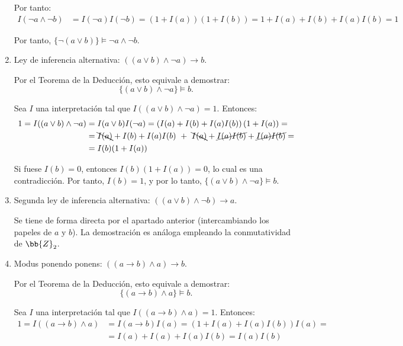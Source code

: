 \begin{ejercicio}
\begin{enumerate}
        Por tanto:
        \begin{align*}
            I(\neg a \land \neg b) &= I(\neg a)I(\neg b) = (1+I(a))(1+I(b)) = 1+I(a)+I(b)+I(a)I(b) = 1
        \end{align*}

        Por tanto, $\{\neg(a\lor b)\} \vDash \neg a \land \neg b$.
        \item Ley de inferencia alternativa: $((a\lor b)\land \neg a) \rightarrow b$.
        
        Por el Teorema de la Deducción, esto equivale a demostrar:
        \begin{equation*}
            \{(a\lor b)\land \neg a\} \vDash b.
        \end{equation*}

        Sea $I$ una interpretación tal que $I((a\lor b)\land \neg a) = 1$. Entonces:
        \begin{align*}
            1=I((a\lor b)\land \neg a) &= I(a\lor b)I(\neg a) = \left(I(a)+I(b)+I(a)I(b)\right)\left(1+I(a)\right) =\\&= \bcancel{I(a)}+I(b)+I(a)I(b)\ +\ \bcancel{I(a)}+\cancel{I(a)I(b)} + \cancel{I(a)I(b)}
            =\\&= I(b)(1+I(a))
        \end{align*}

        Si fuese $I(b) = 0$, entonces $I(b)(1+I(a)) = 0$, lo cual es una contradicción. Por tanto, $I(b) = 1$, y por lo tanto, $\{(a\lor b)\land \neg a\} \vDash b$.
        \item Segunda ley de inferencia alternativa: $((a\lor b)\land \neg b) \rightarrow a$.
        
        Se tiene de forma directa por el apartado anterior (intercambiando los papeles de $a$ y $b$). La demostración es análoga empleando la conmutatividad de $\bb{Z}_2$.
        \item Modus ponendo ponens: $((a \rightarrow b)\land a) \rightarrow b$.
        
        Por el Teorema de la Deducción, esto equivale a demostrar:
        \begin{equation*}
            \{(a \rightarrow b)\land a\} \vDash b.
        \end{equation*}

        Sea $I$ una interpretación tal que $I((a \rightarrow b)\land a) = 1$. Entonces:
        \begin{align*}
            1=I((a \rightarrow b)\land a) &= I(a \rightarrow b)I(a) = \left(1+I(a)+I(a)I(b)\right)I(a) =\\&= I(a)+I(a)+I(a)I(b) = I(a)I(b)
        \end{align*}


\end{enumerate}
\end{ejercicio}
